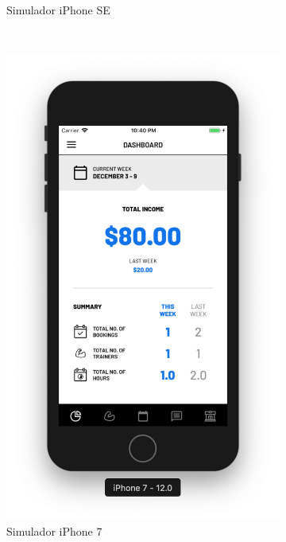 \begin{figure}[H]
\begin{subfigure}[b]{0.3\textwidth}
        \caption{Simulador iPhone SE}
        \label{fig:se}
    \end{subfigure}
    ~
	\begin{subfigure}[b]{0.3\textwidth}
        \includegraphics[width=\textwidth]{pfc/figuras/7.png}
        \caption{Simulador iPhone 7}
        \label{fig:7}
    \end{subfigure}
    ~
    \begin{subfigure}[b]{0.3\textwidth}

\end{subfigure}
\end{figure}
